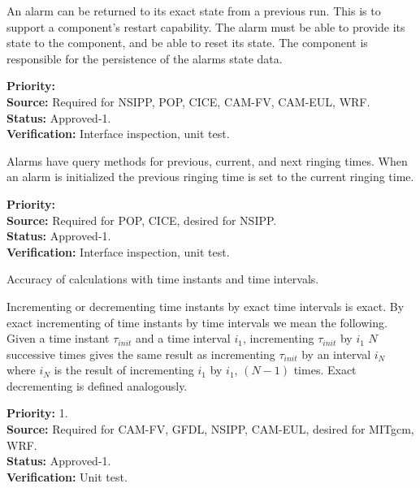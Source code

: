 An alarm can be returned to its exact state from a previous run.
This is to support a component's restart capability.  The alarm must be
able to provide its state to the component, and be able to reset its state.
The component is responsible for the persistence of the alarms state data.
\begin{reqlist}
{\bf Priority:} \\
{\bf Source:} Required for NSIPP, POP, CICE, CAM-FV, CAM-EUL, WRF. \\
{\bf Status:} Approved-1. \\
{\bf Verification:} Interface inspection, unit test.  
\end{reqlist}

Alarms have query methods for previous, current, and next ringing times.
When an alarm is initialized the previous ringing time is set to the current ringing time.
\begin{reqlist}
{\bf Priority:} \\
{\bf Source:} Required for POP, CICE, desired for NSIPP. \\
{\bf Status:} Approved-1. \\
{\bf Verification:} Interface inspection, unit test.  
\end{reqlist}

\label{req:precision}
Accuracy of calculations with time instants and time intervals.

Incrementing or decrementing time instants by exact time intervals is exact.
By exact incrementing of time instants by time intervals we mean the following.
Given a time instant $\tau_{init}$ and a time interval $i_{1}$,
incrementing $\tau_{init}$ by $i_{1}$ $N$ successive times gives the same
result as incrementing $\tau_{init}$ by an interval $i_{N}$ where $i_{N}$
is the result of incrementing $i_{1}$ by $i_{1}$, $(N-1)$ times.  Exact
decrementing is defined analogously.
\begin{reqlist}
{\bf Priority:} 1. \\
{\bf Source:} Required for CAM-FV, GFDL, NSIPP, CAM-EUL, desired for MITgcm, WRF. \\
{\bf Status:} Approved-1. \\
{\bf Verification:} Unit test.  
\end{reqlist}


